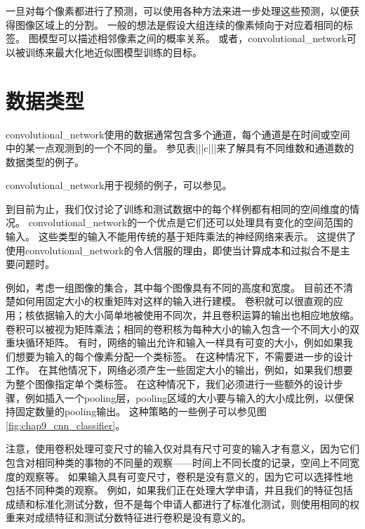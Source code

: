  
一旦对每个像素都进行了预测，可以使用各种方法来进一步处理这些预测，以便获得图像区域上的分割\citep{Briggman-et-al-NIPS2009,Turaga2010,Farabet-et-al-2013}。
一般的想法是假设大组连续的像素倾向于对应着相同的标签。
图模型可以描述相邻像素之间的概率关系。
或者，\gls{convolutional_network}可以被训练来最大化地近似图模型训练的目标\citep{Ning-et-al-2005,Thompson-et-al-NIPS2014}。

\section{数据类型}
\label{sec:data_types}

\gls{convolutional_network}使用的数据通常包含多个通道，每个通道是在时间或空间中的某一点观测到的一个不同的量。
参见表|||c|||来了解具有不同维数和通道数的数据类型的例子。
 
  
 
\gls{convolutional_network}用于视频的例子，可以参见\cite{Chen-Ting-2010}。

到目前为止，我们仅讨论了训练和测试数据中的每个样例都有相同的空间维度的情况。
\gls{convolutional_network}的一个优点是它们还可以处理具有变化的空间范围的输入。
这些类型的输入不能用传统的基于矩阵乘法的神经网络来表示。
这提供了使用\gls{convolutional_network}的令人信服的理由，即使当计算成本和过拟合不是主要问题时。

例如，考虑一组图像的集合，其中每个图像具有不同的高度和宽度。
目前还不清楚如何用固定大小的权重矩阵对这样的输入进行建模。
卷积就可以很直观的应用；核依据输入的大小简单地被使用不同次，并且卷积运算的输出也相应地放缩。
卷积可以被视为矩阵乘法；相同的卷积核为每种大小的输入包含一个不同大小的双重块循环矩阵。
有时，网络的输出允许和输入一样具有可变的大小，例如如果我们想要为输入的每个像素分配一个类标签。
在这种情况下，不需要进一步的设计工作。
在其他情况下，网络必须产生一些固定大小的输出，例如，如果我们想要为整个图像指定单个类标签。
在这种情况下，我们必须进行一些额外的设计步骤，例如插入一个\gls{pooling}层，\gls{pooling}区域的大小要与输入的大小成比例，以便保持固定数量的\gls{pooling}输出。
这种策略的一些例子可以参见图\ref{fig:chap9_cnn_classifier}。

注意，使用卷积处理可变尺寸的输入仅对具有尺寸可变的输入才有意义，因为它们包含对相同种类的事物的不同量的观察——时间上不同长度的记录，空间上不同宽度的观察等。
如果输入具有可变尺寸，卷积是没有意义的，因为它可以选择性地包括不同种类的观察。
例如，如果我们正在处理大学申请，并且我们的特征包括成绩和标准化测试分数，但不是每个申请人都进行了标准化测试，则使用相同的权重来对成绩特征和测试分数特征进行卷积是没有意义的。


